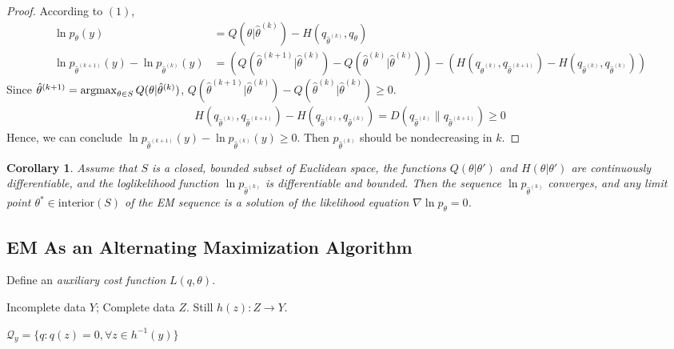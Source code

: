 \documentclass[11pt,a4paper]{article}
\newcommand{\argmax}{\operatornamewithlimits{argmax}}
\newtheorem{corollary}{Corollary}
\begin{document}
\begin{proof}
    According to $(1)$,
    \begin{equation}
        \begin{aligned}
            \ln p_\theta (y)&=Q(\theta|\hat{\theta}^{(k)})-H(q_{\hat{\theta}^{(k)}},q_\theta)\\
            \ln p_{\hat{\theta}^{(k+1)}} (y)-\ln p_{\hat{\theta}^{(k)}} (y)&=(Q(\hat{\theta}^{(k+1)}|\hat{\theta}^{(k)})-Q(\hat{\theta}^{(k)}|\hat{\theta}^{(k)}))-(H(q_{\hat{\theta}^{(k)}},q_{\hat{\theta}^{(k+1)}})-H(q_{\hat{\theta}^{(k)}},q_{\hat{\theta}^{(k)}}))
        \end{aligned}
        \nonumber
    \end{equation}
    Since $\hat{\theta}^{(k+1)}=\argmax_{\theta\in S}Q(\theta|\hat{\theta}^{(k)})$, $Q(\hat{\theta}^{(k+1)}|\hat{\theta}^{(k)})-Q(\hat{\theta}^{(k)}|\hat{\theta}^{(k)})\geq 0$.
    \begin{equation}
        \begin{aligned}
            H(q_{\hat{\theta}^{(k)}},q_{\hat{\theta}^{(k+1)}})-H(q_{\hat{\theta}^{(k)}},q_{\hat{\theta}^{(k)}})=D(q_{\hat{\theta}^{(k)}}\| q_{\hat{\theta}^{(k+1)}})\geq 0
        \end{aligned}
        \nonumber
    \end{equation}
    Hence, we can conclude $\ln p_{\hat{\theta}^{(k+1)}} (y)-\ln p_{\hat{\theta}^{(k)}} (y)\geq 0$. Then $p_{\hat{\theta}^{(k)}}$ should be nondecreasing in $k$.
\end{proof}

\begin{corollary}
    Assume that $S$ is a closed, bounded subset of Euclidean space, the functions $Q(\theta|\theta')$ and $H(\theta|\theta')$ are continuously differentiable, and the loglikelihood function $\ln p_{\hat{\theta}^{(k)}}$ is differentiable and bounded. Then the sequence $\ln p_{\hat{\theta}^{(k)}}$ converges, and any limit point $\theta^*\in \text{interior}(S)$ of the EM sequence is a solution of the likelihood equation $\nabla \ln p_{\theta}=0$.
\end{corollary}


\subsection{EM As an Alternating Maximization Algorithm}
Define an \textit{auxiliary cost function} $L(q,\theta)$.

Incomplete data $Y$; Complete data $Z$. Still $h(z): Z \rightarrow Y$.

$\mathcal{Q}_y=\{q: q(z)=0, \forall z\in h^{-1}(y)\}$
\end{document}
